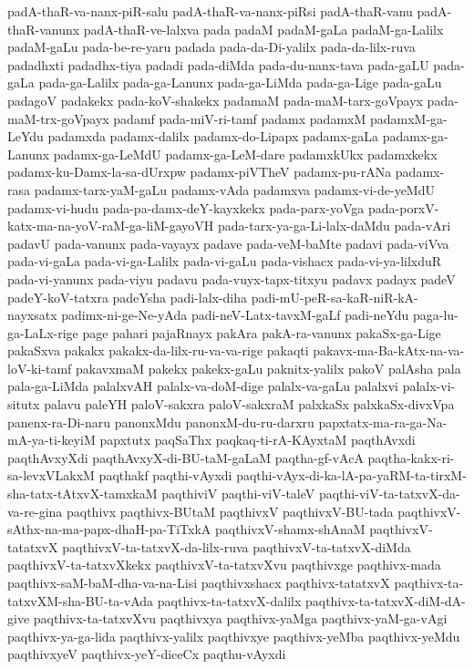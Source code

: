 {padA-thaR-va-nanx-piR-salu
padA-thaR-va-nanx-piRsi
padA-thaR-vanu
padA-thaR-vanunx
padA-thaR-ve-lalxva
pada
padaM
padaM-gaLa
padaM-ga-Lalilx
padaM-gaLu
pada-be-re-yaru
padada
pada-da-Di-yalilx
pada-da-lilx-ruva
padadhxti
padadhx-tiya
padadi
pada-diMda
pada-du-nanx-tava
pada-gaLU
pada-gaLa
pada-ga-Lalilx
pada-ga-Lanunx
pada-ga-LiMda
pada-ga-Lige
pada-gaLu
padagoV
padakekx
pada-koV-shakekx
padamaM
pada-maM-tarx-goVpayx
pada-maM-trx-goVpayx
padamf
pada-miV-ri-tamf
padamx
padamxM
padamxM-ga-LeYdu
padamxda
padamx-dalilx
padamx-do-Lipapx
padamx-gaLa
padamx-ga-Lanunx
padamx-ga-LeMdU
padamx-ga-LeM-dare
padamxkUkx
padamxkekx
padamx-ku-Damx-la-sa-dUrxpw
padamx-piVTheV
padamx-pu-rANa
padamx-rasa
padamx-tarx-yaM-gaLu
padamx-vAda
padamxva
padamx-vi-de-yeMdU
padamx-vi-hudu
pada-pa-damx-deY-kayxkekx
pada-parx-yoVga
pada-porxV-katx-ma-na-yoV-raM-ga-liM-gayoVH
pada-tarx-ya-ga-Li-lalx-daMdu
pada-vAri
padavU
pada-vanunx
pada-vayayx
padave
pada-veM-baMte
padavi
pada-viVva
pada-vi-gaLa
pada-vi-ga-Lalilx
pada-vi-gaLu
pada-vishacx
pada-vi-ya-lilxduR
pada-vi-yanunx
pada-viyu
padavu
pada-vuyx-tapx-titxyu
padavx
padayx
padeV
padeY-koV-tatxra
padeYsha
padi-lalx-diha
padi-mU-peR-sa-kaR-niR-kA-nayxsatx
padimx-ni-ge-Ne-yAda
padi-neV-Latx-tavxM-gaLf
padi-neYdu
paga-lu-ga-LaLx-rige
page
pahari
pajaRnayx
pakAra
pakA-ra-vanunx
pakaSx-ga-Lige
pakaSxva
pakakx
pakakx-da-lilx-ru-va-va-rige
pakaqti
pakavx-ma-Ba-kAtx-na-va-loV-ki-tamf
pakavxmaM
pakekx
pakekx-gaLu
paknitx-yalilx
pakoV
palAsha
pala
pala-ga-LiMda
palalxvAH
palalx-va-doM-dige
palalx-va-gaLu
palalxvi
palalx-vi-situtx
palavu
paleYH
paloV-sakxra
paloV-sakxraM
palxkaSx
palxkaSx-divxVpa
panenx-ra-Di-naru
panonxMdu
panonxM-du-ru-darxru
papxtatx-ma-ra-ga-Na-mA-ya-ti-keyiM
papxtutx
paqSaThx
paqkaq-ti-rA-KAyxtaM
paqthAvxdi
paqthAvxyXdi
paqthAvxyX-di-BU-taM-gaLaM
paqtha-gf-vAcA
paqtha-kakx-ri-sa-levxVLakxM
paqthakf
paqthi-vAyxdi
paqthi-vAyx-di-ka-lA-pa-yaRM-ta-tirxM-sha-tatx-tAtxvX-tamxkaM
paqthiviV
paqthi-viV-taleV
paqthi-viV-ta-tatxvX-da-va-re-gina
paqthivx
paqthivx-BUtaM
paqthivxV
paqthivxV-BU-tada
paqthivxV-sAthx-na-ma-papx-dhaH-pa-TiTxkA
paqthivxV-shamx-shAnaM
paqthivxV-tatatxvX
paqthivxV-ta-tatxvX-da-lilx-ruva
paqthivxV-ta-tatxvX-diMda
paqthivxV-ta-tatxvXkekx
paqthivxV-ta-tatxvXvu
paqthivxge
paqthivx-mada
paqthivx-saM-baM-dha-va-na-Lisi
paqthivxshacx
paqthivx-tatatxvX
paqthivx-ta-tatxvXM-sha-BU-ta-vAda
paqthivx-ta-tatxvX-dalilx
paqthivx-ta-tatxvX-diM-dA-give
paqthivx-ta-tatxvXvu
paqthivxya
paqthivx-yaMga
paqthivx-yaM-ga-vAgi
paqthivx-ya-ga-lida
paqthivx-yalilx
paqthivxye
paqthivx-yeMba
paqthivx-yeMdu
paqthivxyeV
paqthivx-yeY-diceCx
paqthu-vAyxdi
}
